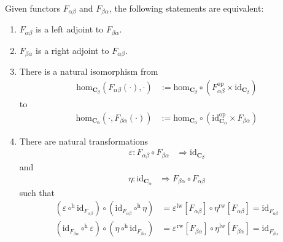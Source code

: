 \begin{thm}
\label{thm:adjoints}
Given functors $F_{\alpha\beta}$ and $F_{\beta\alpha}$, the following statements are equivalent:
\begin{enumerate}
\item[(a)]
$F_{\alpha\beta}$ is a left adjoint to $F_{\beta\alpha}$.
\item[(b)]
$F_{\beta\alpha}$ is a right adjoint to $F_{\alpha\beta}$.
\item[(c)]
There is a natural isomorphism from
\begin{align*}
  \mathrm{hom}_{\mathbf{C}_{\beta}}(F_{\alpha\beta}(\cdot),\cdot)
  &:=
  \mathrm{hom}_{\mathbf{C}_{\beta}}
  \circ
  \left(
    F_{\alpha\beta}^{\mathrm{op}}
    \times
    \mathrm{id}_{\mathbf{C}_{\beta}}
  \right)
\end{align*}
to
\begin{align*}
  \mathrm{hom}_{\mathbf{C}_{\alpha}}(\cdot,F_{\beta\alpha}(\cdot))
  &:=
  \mathrm{hom}_{\mathbf{C}_{\alpha}}
  \circ
  \left(
    \mathrm{id}_{\mathbf{C}_{\alpha}}^{\mathrm{op}}
    \times
    F_{\beta\alpha}
  \right)
\end{align*}
\item[(d)]
There are natural transformations
\begin{align*}
  \varepsilon
  \colon
  F_{\alpha\beta}
  \circ
  F_{\beta\alpha}
  &\Rightarrow
  \mathrm{id}_{\mathbf{C}_{\beta}}
\end{align*}
and
\begin{align*}
  \eta
  \colon
  \mathrm{id}_{\mathbf{C}_{\alpha}}
  &\Rightarrow
  F_{\beta\alpha}
  \circ
  F_{\alpha\beta}
\end{align*}
such that
\begin{align*}
  \left(
    \varepsilon
    \circ^{\textrm{h}}
    \mathrm{id}_{F_{\alpha\beta}}
  \right)
  \circ
  \left(
    \mathrm{id}_{F_{\alpha\beta}}
    \circ^{\textrm{h}}
    \eta
  \right)
  &=
  \varepsilon^{\textrm{lw}}[F_{\alpha\beta}]
  \circ
  \eta^{\textrm{rw}}[F_{\alpha\beta}]
  =
  \mathrm{id}_{F_{\alpha\beta}}
  \\
  \left(
    \mathrm{id}_{F_{\beta\alpha}}
    \circ^{\textrm{h}}
    \varepsilon
  \right)
  \circ
  \left(
    \eta
    \circ^{\textrm{h}}
    \mathrm{id}_{F_{\beta\alpha}}
  \right)
  &=
  \varepsilon^{\textrm{rw}}[F_{\beta\alpha}]
  \circ
  \eta^{\textrm{lw}}[F_{\beta\alpha}]
  =
  \mathrm{id}_{F_{\beta\alpha}}
\end{align*}
\end{enumerate}
\end{thm}
